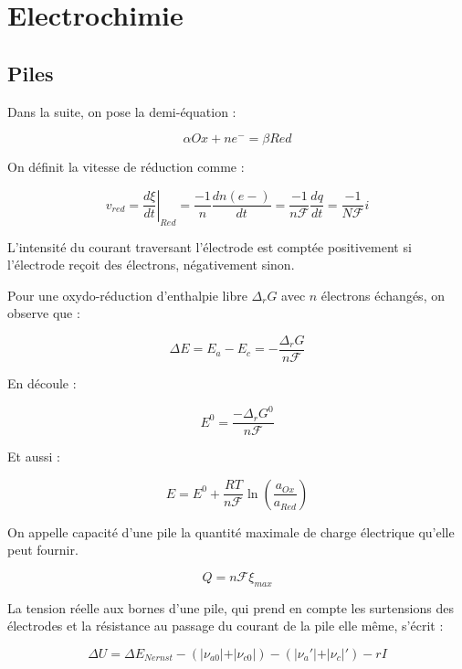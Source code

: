 \documentclass[a4paper,12pt]{book}
\newcommand{\Def}[2]{\begin{tcolorbox}[colback=white,colframe=red!10!green!20!blue!75!, title=Définition : #1]#2\end{tcolorbox}}
\newcommand{\Thr}[2]{\begin{tcolorbox}[sharp corners, colback=white,colframe=red!10!blue!30!green!75!, title=Théorème : #1]#2\end{tcolorbox}}
\begin{document}
\section{Electrochimie}
\subsection{Piles}
Dans la suite, on pose la demi-équation :
\par $$\alpha Ox+ne^-=\beta Red$$
\Def{Vitesse de réaction}{On définit la vitesse de réduction comme :
\par $$v_{red} = \left.\dfrac{d\xi}{dt}\right|_{Red} =\frac{-1}{n}\dfrac{d n(e-)}{dt}=\frac{-1}{n\mathcal{F}}\dfrac{dq}{dt} = \frac{-1}{N\mathcal{F}}i$$
\par L'intensité du courant traversant l'électrode est comptée positivement si l'électrode reçoit des électrons, négativement sinon.}
\Thr{Formule de Nernst}{Pour une oxydo-réduction d'enthalpie libre $\Delta_rG$ avec $n$ électrons échangés, on observe que :
\par $$\Delta E=E_a-E_c =-\frac{\Delta_rG}{n\mathcal{F}}$$
\par En découle :
\par $$E^0 =\frac{-\Delta_rG^0}{n\mathcal{F}}$$
\par Et aussi :
\par $$E = E^0 +\frac{RT}{n\mathcal{F}}\ln\left(\frac{a_{Ox}}{a_{Red}}\right)$$}
\Def{Capacité électrique}{On appelle capacité d'une pile la quantité maximale de charge électrique qu'elle peut fournir.
\par $$Q = n\mathcal{F}\xi_{max}$$}
\Thr{Tension réelle}{La tension réelle aux bornes d'une pile, qui prend en compte les surtensions des électrodes et la résistance au passage du courant de la pile elle même, s'écrit :
\par $$\Delta U = \Delta E_{Nernst}-(\vert\nu_{a0}\vert+\vert\nu_{c0}\vert)-(\vert\nu_a'\vert+\vert\nu_c\vert')-rI$$}
\end{document}
